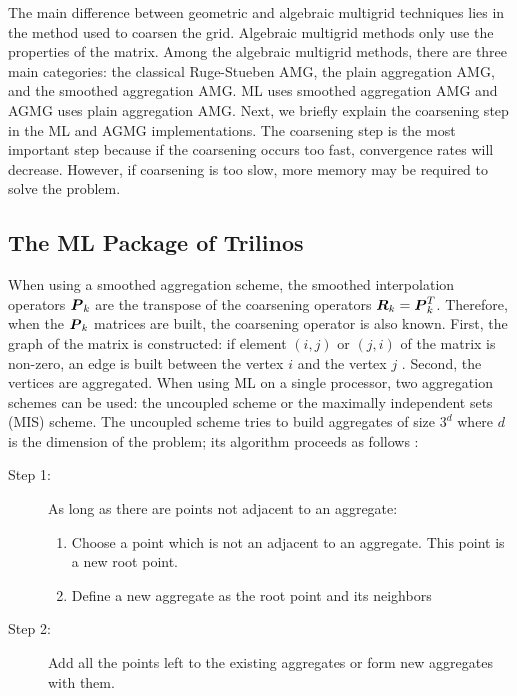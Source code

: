 The main difference between geometric and algebraic multigrid techniques
lies in the method used
to coarsen the grid. Algebraic multigrid methods only use the properties of the
matrix. Among the algebraic multigrid methods, there are three main categories: 
the classical Ruge-Stueben AMG, the plain aggregation AMG, and the
smoothed aggregation AMG. ML uses smoothed aggregation AMG and AGMG
uses plain aggregation AMG. Next, we briefly explain the coarsening step in
the ML and AGMG implementations. The coarsening step is the most important 
step because if the coarsening occurs too fast, convergence rates will 
decrease. However, if coarsening is too slow, more memory may be 
required to solve the problem. 

\subsection{The ML Package of Trilinos}
When using a smoothed aggregation scheme, the smoothed interpolation operators
$\boldsymbol{P}_k$ are the transpose of the coarsening operators
$\boldsymbol{R}_k=\boldsymbol{P}_k^T$. Therefore, when the $\boldsymbol{P}_k$ matrices are built, the
coarsening operator is also known. First, the graph of the matrix is
constructed: if element $(i,j)$ or $(j,i)$ of the matrix is non-zero, an edge
is built between the vertex $i$ and the vertex $j$ \cite{ml_guide}. Second,
the vertices are 
aggregated. When using ML on a single processor, two aggregation schemes can
be used: the uncoupled scheme or the maximally independent sets (MIS) scheme. 
The uncoupled scheme tries to build aggregates of size $3^d$ where $d$ is the
dimension of the problem; its algorithm proceeds as follows \cite{mis}:
\begin{description}
  \item[Step 1:] As long as there are points not adjacent to an aggregate:
    \begin{enumerate}
      \item Choose a point which is not an adjacent to an
        aggregate. This point is a new root point.
      \item Define a new aggregate as the root point and its neighbors 
    \end{enumerate}
  \item[Step 2:] Add all the points left to the existing aggregates or form 
    new aggregates with them.
\end{description}
